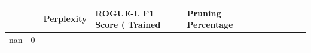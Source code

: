 \begin{table}[H]
\label{tab:evaluation-pipeline-1}
\begin{tabular}{|m{} | m{} | r | R{0.13\textwidth} | R{0.09\textwidth} | R{0.09\textwidth} | R{0.09\textwidth} | R{0.11\textwidth} |}
\toprule
 &  & Perplexity & ROGUE-L F1 Score (%
Trained & Pruning Percentage &  &  &  &  &  &  &  \\
\midrule
nan & 0%
\end{tabular}
\end{table}
